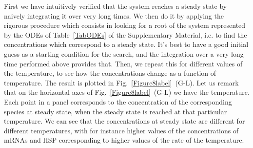 \documentclass[oneside, 10pt, a4paper, twocolumn]{article}
\begin{document}
First we have intuitively verified that the system reaches a steady state by naively integrating it over very long times. %
We then do it by applying the rigorous procedure which consists in looking for a root of the system 
represented by the ODEs of Table~\ref{TabODEs} of the Supplementary Material, i.e. 
to find the concentrations which correspond to a steady state. 
It's best to have a good initial guess as a starting condition for the search, and the integration over a very long time performed above provides that. 
Then, we repeat this for different values of the temperature, to see how the concentrations change as a function of temperature. The result is plotted in Fig.~\ref{Figure8label}~(G-L). Let us remark that on the horizontal axes of Fig.~\ref{Figure8label}~(G-L) we have the temperature. Each point in a panel corresponds to the concentration of the corresponding species at steady state, when the steady state is reached at that particular temperature. 
We can see that the concentrations at steady state are different for different temperatures, with for instance higher values of the concentrations of mRNAs and HSP corresponding to higher values of the rate of the temperature. 
\end{document}
